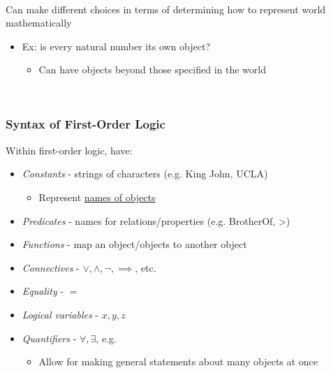 \documentclass[12pt]{extarticle}
\theoremstyle{definition}
\theoremstyle{remark}
\newcommand{\pstart}[0]{\noindent}
\newcommand{\newp}[0]{~\\ \pstart}
\begin{document}
~\\ \pstart
Can make different choices in terms of determining how to represent world mathematically \begin{itemize}
    \item Ex: is every natural number its own object? \begin{itemize}
        \item Can have objects beyond those specified in the world
    \end{itemize}
\end{itemize}

\newp
\subsubsection{Syntax of First-Order Logic}

\pstart
Within first-order logic, have: \begin{itemize}
    \item \textit{Constants} - strings of characters (e.g. King John, UCLA) \begin{itemize}
        \item Represent \ul{names of objects}
    \end{itemize}
    \item \textit{Predicates} - names for relations/properties (e.g. BrotherOf, >)
    \item \textit{Functions} - map an object/objects to another object
    \item \textit{Connectives} - $\lor,\land,\neg,\implies$, etc.
    \item \textit{Equality} - $=$
    \item \textit{Logical variables} - $x,y,z$
    \item \textit{Quantifiers} - $\forall,\exists$, e.g. \begin{itemize}
        \item Allow for making general statements about many objects at once
    \end{itemize}
\end{itemize}
\end{document}
